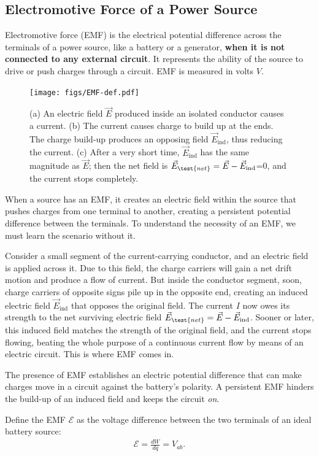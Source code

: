\documentclass[12pt,b4paper]{article}
\begin{document}
\subsection{Electromotive Force of a Power Source}
Electromotive force (EMF) is the electrical potential difference across the terminals of a power source, like a battery or a generator, \textbf{when it is not connected to any external circuit}. It represents the ability of the source to drive or push charges through a circuit. EMF is measured in volts $V$. 
\begin{figure}[H]
    \centering
    \texttt{[image: figs/EMF-def.pdf]}
    \caption{(a) An electric field $\vec{E}$ produced inside an isolated conductor causes a current. (b) The current causes charge to build up at the ends. The charge build-up produces an opposing field $\vec{E}_\text{ind}$, thus reducing the current. (c) After a very short time, $\vec{E}_\text{ind}$ has the same magnitude as $\vec{E}$; then the net field is $\vec{E}_\test{net}=\vec{E}-\vec{E}_\text{ind}$=0, and the current stops completely.}
    \label{fig:EMF-def}
\end{figure}
When a source has an EMF, it creates an electric field within the source that pushes charges from one terminal to another, creating a persistent potential difference between the terminals. To understand the necessity of an EMF, we must learn the scenario without it.

Consider a small segment of the current-carrying conductor, and an electric field is applied across it. Due to this field, the charge carriers will gain a net drift motion and produce a flow of current. But inside the conductor segment, soon, charge carriers of opposite signs pile up in the opposite end, creating an induced electric field $\vec{E}_\text{ind}$ that opposes the original field. The current $I$ now owes its strength to the net surviving electric field $\vec{E}_\test{net}=\vec{E}-\vec{E}_\text{ind}$. Sooner or later, this induced field matches the strength of the original field, and the current stops flowing, beating the whole purpose of a continuous current flow by means of an electric circuit. This is where EMF comes in.

The presence of EMF establishes an electric potential difference that can make charges move in a circuit against the battery's polarity. A persistent EMF hinders the build-up of an induced field and keeps the circuit \textit{on}.

Define the EMF $\mathcal{E}$ as the voltage difference between the two terminals of an ideal battery source:
\begin{align}
    \mathcal{E}=\frac{dW}{dq}=V_{ab}.
\end{align}
\end{document}
